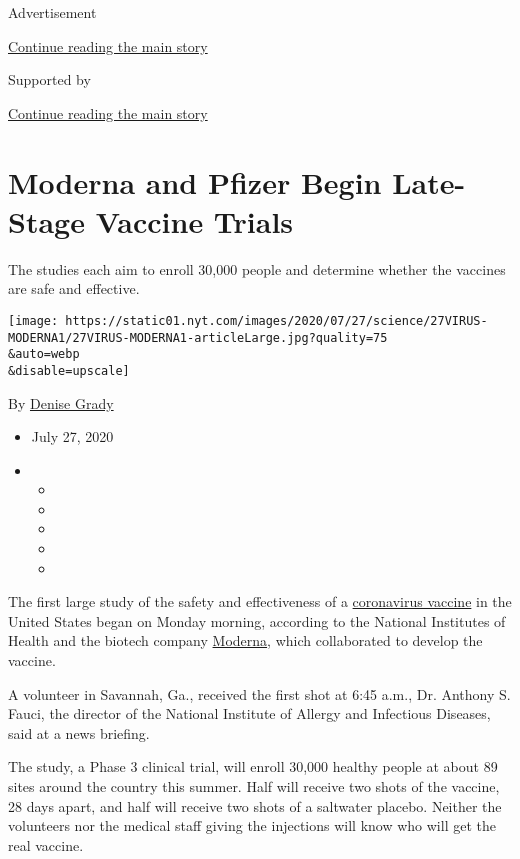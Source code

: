 Advertisement

\protect\hyperlink{after-top}{Continue reading the main story}

Supported by

\protect\hyperlink{after-sponsor}{Continue reading the main story}

\hypertarget{moderna-and-pfizer-begin-late-stage-vaccine-trials}{%
\section{Moderna and Pfizer Begin Late-Stage Vaccine
Trials}\label{moderna-and-pfizer-begin-late-stage-vaccine-trials}}

The studies each aim to enroll 30,000 people and determine whether the
vaccines are safe and effective.

\texttt{[image: https://static01.nyt.com/images/2020/07/27/science/27VIRUS-MODERNA1/27VIRUS-MODERNA1-articleLarge.jpg?quality=75\\\&auto=webp\\\&disable=upscale]}

By \href{https://www.nytimes.com/by/denise-grady}{Denise Grady}

\begin{itemize}
\item
  July 27, 2020
\item
  \begin{itemize}
  \item
  \item
  \item
  \item
  \item
  \end{itemize}
\end{itemize}

The first large study of the safety and effectiveness of a
\href{https://www.nytimes.com/2020/07/30/health/covid-19-vaccine-monkeys.html}{coronavirus
vaccine} in the United States began on Monday morning, according to the
National Institutes of Health and the biotech company
\href{https://www.nytimes.com/2020/07/28/health/coronavirus-moderna-vaccine-monkeys.html}{Moderna},
which collaborated to develop the vaccine.

A volunteer in Savannah, Ga., received the first shot at 6:45 a.m., Dr.
Anthony S. Fauci, the director of the National Institute of Allergy and
Infectious Diseases, said at a news briefing.

The study, a Phase 3 clinical trial, will enroll 30,000 healthy people
at about 89 sites around the country this summer. Half will receive two
shots of the vaccine, 28 days apart, and half will receive two shots of
a saltwater placebo. Neither the volunteers nor the medical staff giving
the injections will know who will get the real vaccine.

